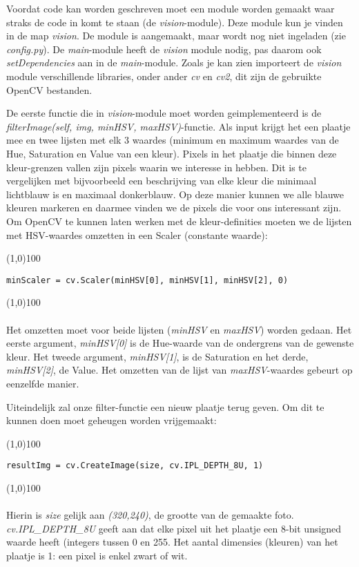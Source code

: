 \documentclass[a4paper]{article}
\begin{document}
Voordat code kan worden geschreven moet een module worden gemaakt waar straks de code in komt te staan (de \textit{vision}-module). Deze module kun je vinden in de map \textit{vision}. De module is aangemaakt, maar wordt nog niet ingeladen (zie \textit{config.py}). De \emph{main}-module heeft de \textit{vision} module nodig, pas daarom ook \textit{setDependencies} aan in de \emph{main}-module.
Zoals je kan zien importeert de \textit{vision} module verschillende libraries, onder ander \textit{cv} en \textit{cv2}, dit zijn de gebruikte OpenCV bestanden.

De eerste functie die in \textit{vision}-module moet worden geimplementeerd is de \textit{filterImage(self, img, minHSV, maxHSV)}-functie.
Als input krijgt het een plaatje mee en twee lijsten met elk 3 waardes (minimum en maximum waardes van de Hue, Saturation en Value van een kleur). Pixels in het plaatje die binnen deze kleur-grenzen vallen zijn pixels waarin we interesse in hebben. Dit is te vergelijken met bijvoorbeeld een beschrijving van elke kleur die minimaal lichtblauw is en maximaal donkerblauw. Op deze manier kunnen we alle blauwe kleuren markeren en daarmee vinden we de pixels die voor ons interessant zijn.
Om OpenCV te kunnen laten werken met de kleur-definities moeten we de lijsten met HSV-waardes omzetten in een Scaler (constante waarde):

\noindent \line(1,0){100}
\begin{verbatim}
minScaler = cv.Scaler(minHSV[0], minHSV[1], minHSV[2], 0)
\end{verbatim}
\noindent \line(1,0){100}
\\\\
Het omzetten moet voor beide lijsten (\textit{minHSV} en \textit{maxHSV}) worden gedaan. Het eerste argument, \textit{minHSV[0]} is de Hue-waarde van de ondergrens van de gewenste kleur. Het tweede argument, \textit{minHSV[1]}, is de Saturation en het derde, \textit{minHSV[2]}, de Value. Het omzetten van de lijst van \textit{maxHSV}-waardes gebeurt op eenzelfde manier.

Uiteindelijk zal onze filter-functie een nieuw plaatje terug geven. Om dit te kunnen doen moet geheugen worden vrijgemaakt:

\noindent \line(1,0){100}
\begin{verbatim}
resultImg = cv.CreateImage(size, cv.IPL_DEPTH_8U, 1)
\end{verbatim}
\noindent \line(1,0){100}
\\\\
Hierin is \textit{size} gelijk aan \textit{(320,240)}, de grootte van de gemaakte foto. \textit{cv.IPL\_DEPTH\_8U} geeft aan dat elke pixel uit het plaatje een 8-bit unsigned waarde heeft (integers tussen 0 en 255. Het aantal dimensies (kleuren) van het plaatje is 1: een pixel is enkel zwart of wit.
\end{document}
